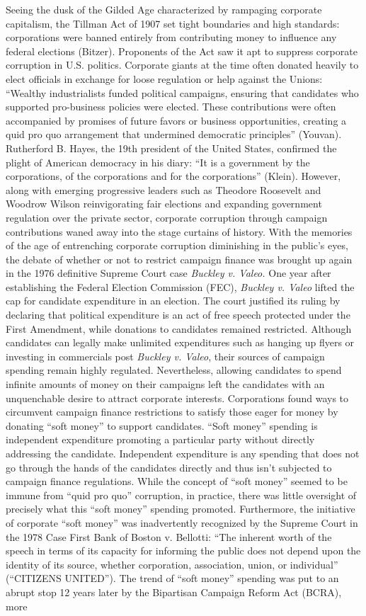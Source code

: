 \documentclass[12pt, a4paper, twoside]{article}
\begin{document}
Seeing the dusk of the Gilded Age characterized by rampaging corporate capitalism, the Tillman Act of 1907 set tight boundaries and high standards: corporations were banned entirely from contributing money to influence any federal elections (Bitzer). Proponents of the Act saw it apt to suppress corporate corruption in U.S. politics. Corporate giants at the time often donated heavily to elect officials in exchange for loose regulation or help against the Unions: “Wealthy industrialists funded political campaigns, ensuring that candidates who supported pro-business policies were elected. These contributions were often accompanied by promises of future favors or business opportunities, creating a quid pro quo arrangement that undermined democratic principles” (Youvan). Rutherford B. Hayes, the 19th president of the United States, confirmed the plight of American democracy in his diary: “It is a government by the corporations, of the corporations and for the corporations” (Klein). However, along with emerging progressive leaders such as Theodore Roosevelt and Woodrow Wilson reinvigorating fair elections and expanding government regulation over the private sector, corporate corruption through campaign contributions waned away into the stage curtains of history. With the memories of the age of entrenching corporate corruption diminishing in the public’s eyes, the debate of whether or not to restrict campaign finance was brought up again in the 1976 definitive Supreme Court case \emph{Buckley v. Valeo.} One year after establishing the Federal Election Commission (FEC), \emph{Buckley v. Valeo} lifted the cap for candidate expenditure in an election. The court justified its ruling by declaring that political expenditure is an act of free speech protected under the First Amendment, while donations to candidates remained restricted. Although candidates can legally make unlimited expenditures such as hanging up flyers or investing in commercials post \emph{Buckley v. Valeo}, their sources of campaign spending remain highly regulated. Nevertheless, allowing candidates to spend infinite amounts of money on their campaigns left the candidates with an unquenchable desire to attract corporate interests. Corporations found ways to circumvent campaign finance restrictions to satisfy those eager for money by donating “soft money” to support candidates. “Soft money” spending is independent expenditure promoting a particular party without directly addressing the candidate. Independent expenditure is any spending that does not go through the hands of the candidates directly and thus isn’t subjected to campaign finance regulations. While the concept of “soft money” seemed to be immune from “quid pro quo” corruption, in practice, there was little oversight of precisely what this “soft money” spending promoted. Furthermore, the initiative of corporate “soft money” was inadvertently recognized by the Supreme Court in the 1978 Case First Bank of Boston v. Bellotti: “The inherent worth of the speech in terms of its capacity for informing the public does not depend upon the identity of its source, whether corporation, association, union, or individual” (“CITIZENS UNITED”). The trend of “soft money” spending was put to an abrupt stop 12 years later by the Bipartisan Campaign Reform Act (BCRA), more 
\end{document}
